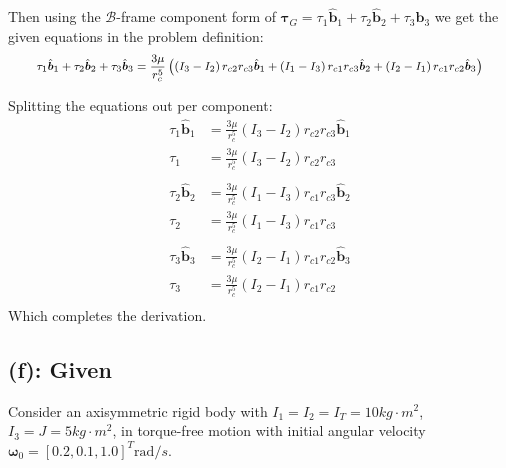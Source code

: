 \documentclass[titlepage]{article}
\begin{document}
Then using the $\mathcal{B}$-frame component form of $\boldsymbol{\tau}_G=\tau_{1}\hat{\boldsymbol{b}}_1+\tau_{2}\hat{\boldsymbol{b}}_2+\tau_{3}\hat{\boldsymbol{b}}_3$ we get the given equations in the problem definition:
\begin{equation}
	\footnotesize
	\begin{split}
		\tau_{1}\hat{\boldsymbol{b}}_1+\tau_{2}\hat{\boldsymbol{b}}_2+\tau_{3}\hat{\boldsymbol{b}}_3&=\frac{3\mu}{r_c^5}\left(\left(I_3-I_2\right)r_{c2}r_{c3}\hat{\boldsymbol{b}}_1+\left(I_1-I_3\right)r_{c1}r_{c3}\hat{\boldsymbol{b}}_2+\left(I_2-I_1\right)r_{c1}r_{c2}\hat{\boldsymbol{b}}_3\right) \\
	\end{split}
	\normalsize
\end{equation}

\begin{mdframed}[linewidth=1pt, innertopmargin=10pt, innerbottommargin=10pt]
	Splitting the equations out per component:
	\begin{equation}
		\begin{split}
			\tau_{1}\hat{\boldsymbol{b}}_1&=\frac{3\mu}{r_c^5}\left(I_3-I_2\right)r_{c2}r_{c3}\hat{\boldsymbol{b}}_1 \\
			\tau_{1}&=\frac{3\mu}{r_c^5}\left(I_3-I_2\right)r_{c2}r_{c3} \\
			\\
			\tau_{2}\hat{\boldsymbol{b}}_2&=\frac{3\mu}{r_c^5}\left(I_1-I_3\right)r_{c1}r_{c3}\hat{\boldsymbol{b}}_2\\
			\tau_{2}&=\frac{3\mu}{r_c^5}\left(I_1-I_3\right)r_{c1}r_{c3}\\
			\\
			\tau_{3}\hat{\boldsymbol{b}}_3&=\frac{3\mu}{r_c^5}\left(I_2-I_1\right)r_{c1}r_{c2}\hat{\boldsymbol{b}}_3\\
			\tau_{3}&=\frac{3\mu}{r_c^5}\left(I_2-I_1\right)r_{c1}r_{c2}\\
		\end{split}
	\end{equation}
	Which completes the derivation.
\end{mdframed}

\subsection*{(f): Given}
Consider an axisymmetric rigid body with $I_1=I_2=I_T=10kg\cdot m^2$, $I_3=J=5kg\cdot m^2$, in torque-free motion with initial angular velocity $\boldsymbol{\omega}_0=[0.2, 0.1, 1.0]^T \text{rad}/s$.\\
\end{document}
